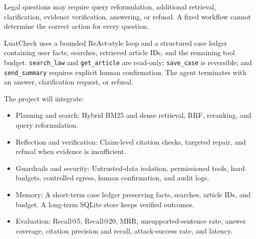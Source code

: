 \documentclass[a4paper,11pt]{article}
\newcommand{\block}[1]{\vspace{3pt}{\bfseries\large #1}\par\vspace{0pt}}
\begin{document}
\block{WHY AN AGENT}
Legal questions may require query reformulation, additional retrieval, clarification, evidence verification, answering, or refusal. A fixed workflow cannot determine the correct action for every question.

LuatCheck uses a bounded ReAct-style loop and a structured case ledger containing user facts, searches, retrieved article IDs, and the remaining tool budget. \texttt{search\_law} and \texttt{get\_article} are read-only; \texttt{save\_case} is reversible; and \texttt{send\_summary} requires explicit human confirmation. The agent terminates with an answer, clarification request, or refusal.

\block{CANDIDATE AXES}
The project will integrate:
\begin{itemize}[leftmargin=17pt,itemsep=1pt,topsep=2pt,parsep=0pt]
\item Planning and search: Hybrid BM25 and dense retrieval, RRF, reranking, and query reformulation.
\item Reflection and verification: Claim-level citation checks, targeted repair, and refusal when evidence is insufficient.
\item Guardrails and security: Untrusted-data isolation, permissioned tools, hard budgets, controlled egress, human confirmation, and audit logs.
\item Memory: A short-term case ledger preserving facts, searches, article IDs, and budget. A long-term SQLite store keeps verified outcomes.
\item Evaluation: Recall@5, Recall@20, MRR, unsupported-sentence rate, answer coverage, citation precision and recall, attack-success rate, and latency.
\end{itemize}
\end{document}
